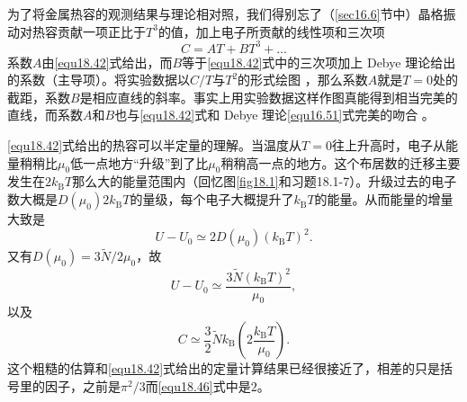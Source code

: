 为了将金属热容的观测结果与理论相对照，我们得别忘了（\ref{sec16.6}节中）晶格振动对热容贡献一项正比于$T^3$的值，加上电子所贡献的线性项和三次项
\begin{equation}
C=AT+BT^3+\dots
\end{equation}
系数$A$由\eqref{equ18.42}式给出，而$B$等于\eqref{equ18.42}式中的三次项加上 Debye 理论给出的系数（主导项）。将实验数据以$C/T$与$T^2$的形式绘图%
%
，那么系数$A$就是$T=0$处的截距，系数$B$是相应直线的斜率。事实上用实验数据这样作图真能得到相当完美的直线，而系数$A$和$B$也与\eqref{equ18.42}式和 Debye 理论\eqref{equ16.51}式完美的吻合%
%
。

\eqref{equ18.42}式给出的热容可以半定量的理解。当温度从$T=0$往上升高时，电子从能量稍稍比$\mu_0$低一点地方``升级''到了比$\mu_0$稍稍高一点的地方。这个布居数的迁移主要发生在$2k_\text{B}T$那么大的能量范围内（回忆图\ref{fig18.1}和习题18.1-7）。升级过去的电子数大概是$D(\mu_0)2k_\text{B}T$的量级，每个电子大概提升了$k_\text{B}T$的能量。从而能量的增量大致是
\begin{equation}
U-U_0\simeq 2D(\mu_0)(k_\text{B}T)^2.
\end{equation}
又有$D(\mu_0)=3\tilde N/2\mu_0$，故
\begin{equation}
U-U_0\simeq\frac{3\tilde N(k_\text{B}T)^2}{\mu_0},
\end{equation}
以及
\begin{equation}
C\simeq \frac{3}{2}\tilde Nk_\text{B}\left(2\frac{k_\text{B}T}{\mu_0}\right).
\label{equ18.46}
\end{equation}
这个粗糙的估算和\eqref{equ18.42}式给出的定量计算结果已经很接近了，相差的只是括号里的因子，之前是$\pi^2/3$而\eqref{equ18.46}式中是$2$。

